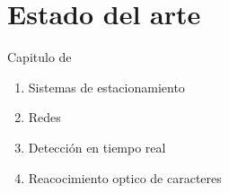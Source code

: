 \chapter{Estado del arte}

Capitulo de

\begin{enumerate}
    \item Sistemas de estacionamiento
    \item Redes
    \item Detección en tiempo real
    \item Reacocimiento optico de caracteres
\end{enumerate}

